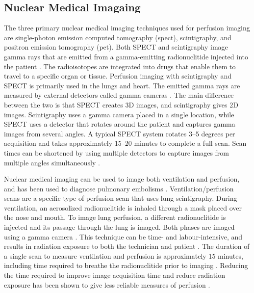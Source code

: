\subsection{Nuclear Medical Imagaing}
The three primary nuclear medical imaging techniques used for perfusion imaging are 
single-photon emission computed tomography (\acrshort{spect}), scintigraphy, 
and positron emission tomography (\acrshort{pet}). 
Both SPECT and scintigraphy image gamma rays that are emitted from a gamma-emitting 
radionuclitide
injected into the patient \parencite{mettler_essentials_2006}. 
The radioisotopes are integrated into drugs 
that enable them to travel to a specific organ or tissue. 
Perfusion imaging with scintigraphy and SPECT 
is primarily used in the lungs and heart. 
The emitted gamma rays are measured by external detectors called 
gamma cameras \parencite{mettler_essentials_2006}. 
The main difference between the two is that SPECT creates 3D images, and 
scintigraphy gives 2D images.
Scintigraphy uses a gamma camera placed in a single location, while SPECT 
uses a detector that rotates around the patient and captures gamma images from 
several angles. A typical SPECT system rotates 3--5 degrees per acquisition 
and takes approximately 15--20 minutes to complete a full scan. 
Scan times can be shortened by using
multiple detectors to capture
images from multiple angles simultaneously \parencite{mettler_essentials_2006}.

Nuclear medical imaging can be used to image both ventilation and perfusion, and
has been used to diagnose pulmonary embolisms \parencite{mortensen_lung_2019}.
Ventilation/perfusion scans are a specific type of perfusion scan that uses lung
scintigraphy. During ventilation, an aerosolized radionuclitide is inhaled through a mask placed
over the nose and mouth. To image lung perfusion, a different radionuclitide 
is injected and its passage through 
the lung is imaged.
Both phases are imaged using a gamma camera \parencite{mortensen_lung_2019}. 
This technique can be time- and labour-intensive, and results in 
radiation exposure to both the technician and patient \parencite{gandev_comparison_2005}.
The duration of a single scan to measure ventilation and  
perfusion is approximately 15 minutes, including time required to breathe the radionuclitide
prior to imaging \parencite{hur_optimizing_2014}. Reducing the time 
required to improve image acquisition time and reduce radiation exposure
has been shown to give less reliable measures of perfusion \parencite{hur_optimizing_2014}.

